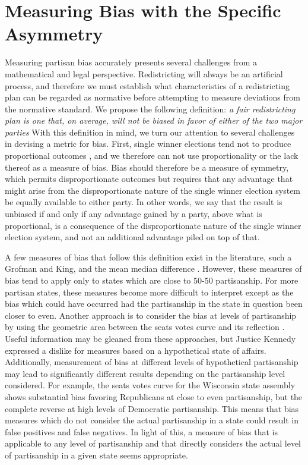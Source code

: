 \documentclass[preprint,12pt]{article}
\begin{document}
\section{Measuring Bias with the Specific Asymmetry\label{sec:MB}}

Measuring partisan bias accurately presents several challenges from a mathematical and legal perspective.
Redistricting will always be an artificial process, and therefore we must establish what characteristics of a redistricting plan can be regarded as normative before attempting to measure deviations from the normative standard.
We propose the following definition: \emph{a fair redistricting plan is one that, on average, will not be biased in favor of either of the two major parties}
With this definition in mind, we turn our attention to several challenges in devising a metric for bias.
First, single winner elections tend not to produce proportional outcomes \cite{Kendall_1950_10.2307/588113}, and we therefore can not use proportionality or the lack thereof as a measure of bias.
Bias should therefore be a measure of symmetry, which permits disproportionate outcomes but requires that any advantage that might arise from the disproportionate nature of the single winner election system be equally available to either party.
In other words, we say that the result is unbiased if and only if any advantage gained by a party, above what is proportional, is a consequence of the disproportionate nature of the single winner election system, and not an additional advantage piled on top of that.

A few measures of bias that follow this definition exist in the literature, such a Grofman and King, and the mean median difference \cite{Grofman_2008_,Wang__,Wang_2016_10.1089/elj.2016.0387}.
However, these measures of bias tend to apply only to states which are close to 50-50 partisanship.
For more partisan states, these measures become more difficult to interpret except as the bias which could have occurred had the partisanship in the state in question been closer to even.
Another approach is to consider the bias at levels of partisanship by using the geometric area between the seats votes curve and its reflection \cite{Nagle_2015_10.1089/elj.2015.0311}.
Useful information may be gleaned from these approaches, but Justice Kennedy expressed a dislike for measures based on a hypothetical state of affairs.
Additionally, measurement of bias at different levels of hypothetical partisanship may lead to significantly different results depending on the partisanship level considered.
For example, the seats votes curve for the Wisconsin state assembly shows substantial bias favoring Republicans at close to even partisanship, but the complete reverse at high levels of Democratic partisanship.
This means that bias measures which do not consider the actual partisanship in a state could result in false positives and false negatives.
In light of this, a measure of bias that is applicable to any level of partisanship and that directly considers the actual level of partisanship in a given state seems appropriate.
\end{document}
